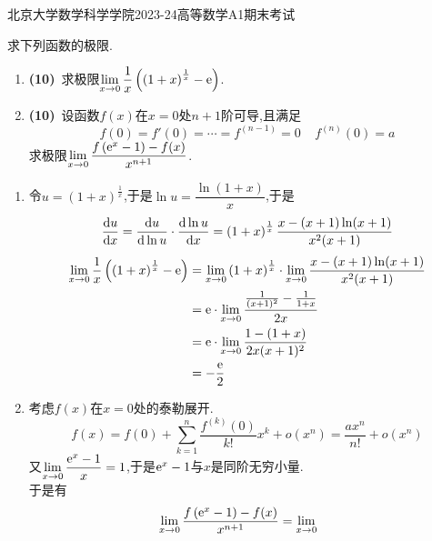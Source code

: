 \documentclass{ctexart}
\begin{document}
\pagestyle{empty}
\begin{center}\Large
    北京大学数学科学学院2023-24高等数学A1期末考试
\end{center}
\begin{problem}[1.(20\songti{分})]
    求下列函数的极限.
    \begin{enumerate}[label=\tbf{(\arabic*)}]
        \item \textbf{(10)}\ 求极限$\displaystyle\lim_{x\to0}\dfrac1x\left(\left(1+x\right)^{\frac1x}-\mathrm{e}\right)$.
        \item \textbf{(10)}\ 设函数$f(x)$在$x=0$处$n+1$阶可导,且满足\[f(0)=f'(0)=\cdots=f^{(n-1)}=0\ \ \ \ \ f^{(n)}(0)=a\]求极限$\displaystyle\lim_{x\to0}\dfrac{f\left(\mathrm{e}^x-1\right)-f(x)}{x^{n+1}}$.
    \end{enumerate}
\end{problem}
\begin{solution}
    \begin{enumerate}[label=\tbf{(\arabic*)}]
        \item 令$u=\left(1+x\right)^{\frac1x}$,于是$\ln u=\dfrac{\ln(1+x)}{x}$,于是
            \[\dfrac{\mathrm{d} u}{\mathrm{d} x}=\dfrac{\mathrm{d} u}{\mathrm{d}\ln u}\cdot\dfrac{\mathrm{d}\ln u}{\mathrm{d} x}=\left(1+x\right)^{\frac1x}\dfrac{x-(x+1)\ln(x+1)}{x^2(x+1)}\]
            \[\begin{aligned}
                \lim_{x\to0}\dfrac1x\left(\left(1+x\right)^{\frac1x}-\mathrm{e}\right)
                &= \lim_{x\to0}\left(1+x\right)^{\frac1x}\cdot\lim_{x\to0}\dfrac{x-(x+1)\ln(x+1)}{x^2(x+1)} \\
                &= \mathrm{e}\cdot\lim_{x\to0}\dfrac{\frac{1}{(x+1)^2}-\frac{1}{1+x}}{2x} \\
                &= \mathrm{e}\cdot\lim_{x\to0}\dfrac{1-(1+x)}{2x(x+1)^2} \\
                &= -\dfrac{\mathrm{e}}{2}
            \end{aligned}\]
        \item 考虑$f(x)$在$x=0$处的泰勒展开.
            \[f(x)=f(0)+\sum_{k=1}^{n}\dfrac{f^{(k)}(0)}{k!}x^k+o(x^n)=\dfrac{ax^n}{n!}+o(x^n)\]
            又$\displaystyle\lim_{x\to0}\dfrac{\mathrm{e}^x-1}{x}=1$,于是$\mathrm{e}^x-1$与$x$是同阶无穷小量.\\
            于是有
            \[\begin{aligned}
                \lim_{x\to0}\dfrac{f\left(\mathrm{e}^x-1\right)-f(x)}{x^{n+1}}
                &= \lim_{x\to0}\dfrac{}{}
            \end{aligned}\]
    \end{enumerate}
\end{solution}
\end{document}
